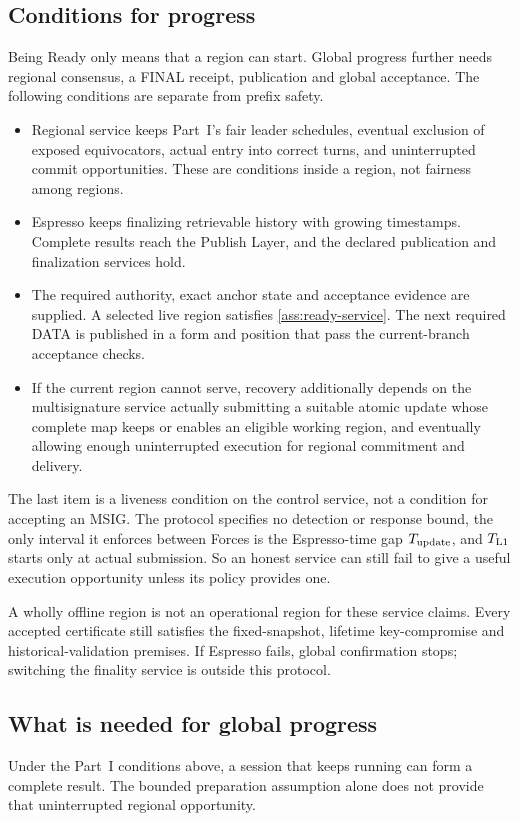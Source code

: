 \documentclass[11pt,a4paper]{article}
\newcounter{protocol}
\begin{document}
\subsection{Conditions for progress}
\label{sec:progress}
Being Ready only means that a region can start. Global progress further
needs regional consensus, a FINAL receipt, publication and global
acceptance. The following conditions are separate from prefix safety.
\begin{itemize}
\item Regional service keeps Part~I's fair leader schedules, eventual
exclusion of exposed equivocators, actual entry into correct turns, and
uninterrupted commit opportunities. These are conditions inside a region,
not fairness among regions.
\item Espresso keeps finalizing retrievable history with growing
timestamps. Complete results reach the Publish Layer, and the declared
publication and finalization services hold.
\item The required authority, exact anchor state and acceptance evidence
are supplied. A selected live region satisfies \cref{ass:ready-service}.
The next required DATA is published in a form and position that pass the
current-branch acceptance checks.
\item If the current region cannot serve, recovery additionally depends
on the multisignature service actually submitting a suitable atomic
update whose complete map keeps or enables an eligible working region,
and eventually allowing
enough uninterrupted execution for regional commitment and delivery.
\end{itemize}
The last item is a liveness condition on the control service, not a
condition for accepting an MSIG. The protocol specifies no detection or
response bound, the only interval it enforces between Forces is the
Espresso-time gap $T_{\rm update}$, and $T_{\rm L1}$ starts only at actual
submission. So an honest service can still fail to
give a useful execution opportunity unless its policy provides one.

A wholly offline region is not an operational region for these service
claims. Every accepted certificate still satisfies the fixed-snapshot,
lifetime key-compromise and historical-validation premises. If Espresso fails, global confirmation stops; switching the
finality service is outside this protocol.

\subsection{What is needed for global progress}
\label{sec:global-progress}
Under the Part~I conditions above, a session that keeps running can form
a complete result. The bounded preparation assumption alone does not
provide that uninterrupted regional opportunity.
\end{document}
